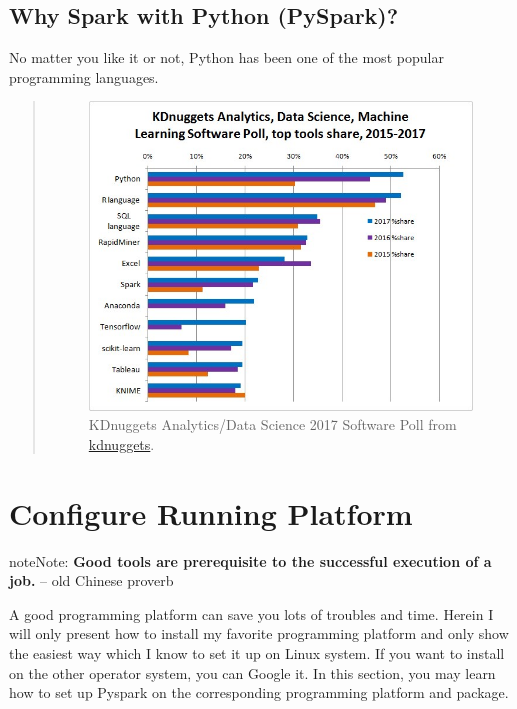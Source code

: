 \documentclass[letterpaper,11pt,english]{sphinxmanual}
\begin{document}
\section{Why Spark with Python (PySpark)?}
\label{why:why-spark-with-python-pyspark}
No matter you like it or not, Python has been one of the most popular programming languages.
\begin{quote}
\begin{figure}[htbp]
\centering
\capstart

\includegraphics{languages.jpg}
\caption{KDnuggets Analytics/Data Science 2017 Software Poll from \href{http://www.kdnuggets.com/2017/05/poll-analytics-data-science-machine-learning-software-leaders.html}{kdnuggets}.}\label{why:fig-languages}\end{figure}
\end{quote}


\chapter{Configure Running Platform}
\label{setup:configure-running-platform}\label{setup:setup}\label{setup:kdnuggets}\label{setup::doc}
\begin{notice}{note}{Note:}
\textbf{Good tools are prerequisite to the successful execution
of a job.} -- old Chinese proverb
\end{notice}

A good programming platform can save you lots of troubles and time.
Herein I will only present how to install my favorite programming
platform and only show the easiest way which I know to set it up
on Linux system. If you want to install on the other operator
system, you can Google it. In this section, you may learn how to
set up Pyspark on the corresponding programming platform and package.
\end{document}

